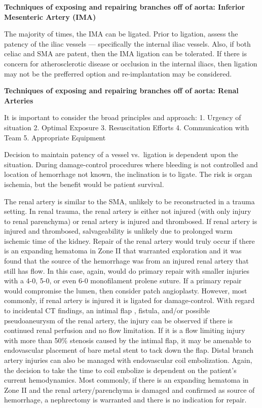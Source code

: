 \documentclass[
]{book}
\begin{document}
\textbf{Techniques of exposing and repairing branches off of aorta: Inferior
Mesenteric Artery (IMA)}

The majority of times, the IMA can be ligated. Prior to ligation, assess
the patency of the iliac vessels --- specifically the internal iliac
vessels. Also, if both celiac and SMA are patent, then the IMA ligation
can be tolerated. If there is concern for atherosclerotic disease or
occlusion in the internal iliacs, then ligation may not be the
prefferred option and re-implantation may be considered.

\textbf{Techniques of exposing and repairing branches off of aorta: Renal
Arteries}

It is important to consider the broad principles and approach:
1. Urgency of situation
2. Optimal Exposure
3. Resuscitation Efforts
4. Communication with Team
5. Appropriate Equipment

Decision to maintain patency of a vessel vs.~ligation is dependent upon the situation. During damage-control procedures where bleeding is not controlled and location of hemorrhage not known, the inclination is to ligate. The risk is organ ischemia, but the benefit would be patient survival.

The renal artery is similar to the SMA, unlikely to be reconstructed in a trauma setting. In renal trauma, the renal artery is either not injured (with only injury to renal parenchyma) or renal artery is injured and thrombosed. If renal artery is injured and thrombosed, salvageability is unlikely due to prolonged warm ischemic time of the kidney. Repair of the renal artery would truly occur if there is an expanding hematoma in Zone II that warranted exploration and it was found that the source of the hemorrhage was from an injured renal artery that still has flow. In this case, again, would do primary repair with smaller injuries with a 4-0, 5-0, or even 6-0 monofilament prolene suture. If a primary repair would compromise the lumen, then consider patch angioplasty. However, most commonly, if renal artery is injured it is ligated for damage-control. With regard to incidental CT findings, an intimal flap , fistula, and/or possible pseudoaneurysm of the renal artery, the injury can be observed if there is continued renal perfusion and no flow limitation. If it is a flow limiting injury with more than 50\% stenosis caused by the intimal flap, it may be amenable to endovascular placement of bare metal stent to tack down the flap. Distal branch artery injuries can also be managed with endovascular coil embolization. Again, the decision to take the time to coil embolize is dependent on the patient's current hemodynamics. Most commonly, if there is an expanding hematoma in Zone II and the renal artery/parenchyma is damaged and confirmed as source of hemorrhage, a nephrectomy is warranted and there is no indication for repair.
\end{document}
